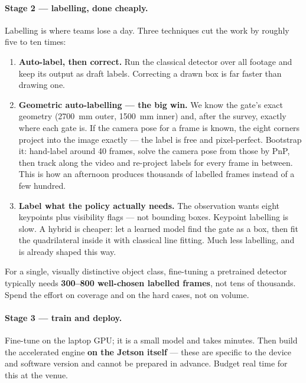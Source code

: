 \paragraph{Stage 2 --- labelling, done cheaply.}
Labelling is where teams lose a day. Three techniques cut the work by roughly five to ten times:
\begin{enumerate}
\item \textbf{Auto-label, then correct.} Run the classical detector over all footage and keep its
output as draft labels. Correcting a drawn box is far faster than drawing one.
\item \textbf{Geometric auto-labelling --- the big win.} We know the gate's exact geometry
(\SI{2700}{mm} outer, \SI{1500}{mm} inner) and, after the survey, exactly where each gate is. If the
camera pose for a frame is known, the eight corners project into the image exactly --- the label is
free and pixel-perfect. Bootstrap it: hand-label around 40 frames, solve the camera pose from those
by PnP, then track along the video and re-project labels for every frame in between. This is how an
afternoon produces thousands of labelled frames instead of a few hundred.
\item \textbf{Label what the policy actually needs.} The observation wants eight keypoints plus
visibility flags --- not bounding boxes. Keypoint labelling is slow. A hybrid is cheaper: let a
learned model find the gate as a box, then fit the quadrilateral inside it with classical line
fitting. Much less labelling, and  is already shaped
this way.
\end{enumerate}
For a single, visually distinctive object class, fine-tuning a pretrained detector typically needs
\textbf{300--800 well-chosen labelled frames}, not tens of thousands. Spend the effort on coverage
and on the hard cases, not on volume.

\paragraph{Stage 3 --- train and deploy.}
Fine-tune on the laptop GPU; it is a small model and takes minutes. Then build the accelerated engine
\textbf{on the Jetson itself} --- these are specific to the device and software version and cannot be
prepared in advance. Budget real time for this at the venue.

